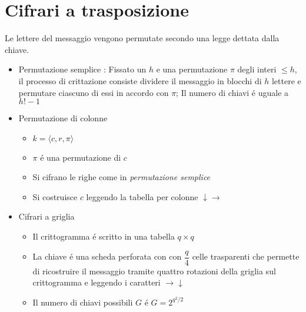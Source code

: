 \section{Cifrari a trasposizione}

Le lettere del messaggio vengono permutate secondo una legge dettata dalla chiave.

\begin{itemize}
    \item Permutazione semplice : Fissato un $h$ e una permutazione $\pi$ degli interi $\leq h$, il processo di crittazione consiste dividere il messaggio in blocchi di $h$ lettere e permutare ciascuno di essi in accordo con $\pi$; Il numero di chiavi \'e uguale a $h! - 1$
    \item Permutazione di colonne
    \begin{itemize}
        \item $k = \langle c, r, \pi \rangle$
        \item $\pi$ \'e una permutazione di $c$
        \item Si cifrano le righe come in \textit{permutazione semplice}
        \item Si costruisce $c$ leggendo la tabella per colonne $\downarrow \rightarrow$
    \end{itemize}
    \item Cifrari a griglia
    \begin{itemize}
        \item Il crittogramma \'e scritto in una tabella $q \times q$
        \item La chiave \'e una scheda perforata con con $\dfrac{q}{4}$ celle trasparenti che permette di ricostruire il messaggio tramite quattro rotazioni della griglia sul crittogramma e leggendo i caratteri $\rightarrow \downarrow$
        \item Il numero di chiavi possibili $G$ \'e $G = 2^{q^2/2}$
    \end{itemize}
\end{itemize}
